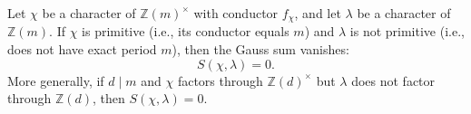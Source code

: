 Let $\chi$ be a character of $\mathbb{Z}(m)^\times$ with conductor $f_\chi$, and let $\lambda$ be a character of $\mathbb{Z}(m)$. If $\chi$ is primitive (i.e., its conductor equals $m$) and $\lambda$ is not primitive (i.e., does not have exact period $m$), then the Gauss sum vanishes:
$$
S(\chi, \lambda) = 0.
$$
More generally, if $d \mid m$ and $\chi$ factors through $\mathbb{Z}(d)^\times$ but $\lambda$ does not factor through $\mathbb{Z}(d)$, then $S(\chi, \lambda) = 0$.
